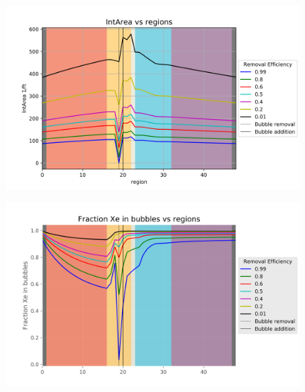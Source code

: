 \begin{figure}[p] 
\centering
\begin{minipage}{.5\textwidth}
  \centering
  \includegraphics[width=1.0\linewidth]{images/EffIntArea.png}
  \label{fig:EffIntAreaCon}
\end{minipage}%
\begin{minipage}{.5\textwidth}
  \centering
  \includegraphics[width=1.0\linewidth]{images/EffFractionXeInBubbles.png}
  \label{fig:EffPercentXe}
\end{minipage}
\end{figure}

\FloatBarrier
\newpage
\FloatBarrier


